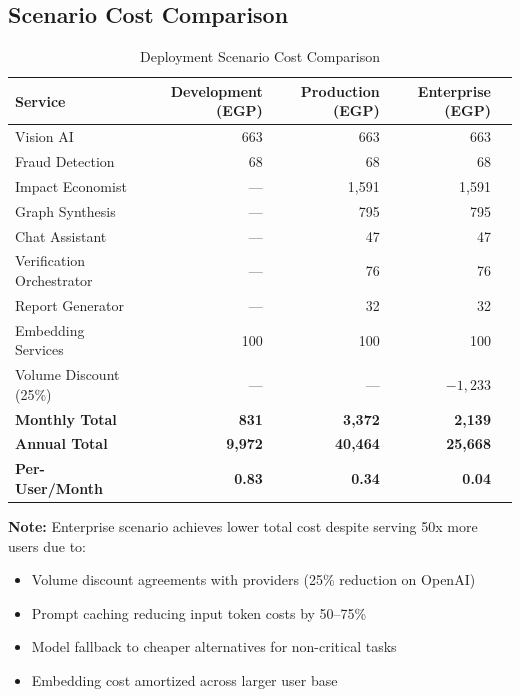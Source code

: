 \documentclass[11pt,a4paper]{article}
\begin{document}
\subsection{Scenario Cost Comparison}

\begin{table}[H]
\centering
\begin{tabular}{|l|r|r|r|r|}
\hline
\textbf{Service} & \textbf{Development (EGP)} & \textbf{Production (EGP)} & \textbf{Enterprise (EGP)} \\
\hline
Vision AI & 663 & 663 & 663 \\
\hline
Fraud Detection & 68 & 68 & 68 \\
\hline
Impact Economist & --- & 1,591 & 1,591 \\
\hline
Graph Synthesis & --- & 795 & 795 \\
\hline
Chat Assistant & --- & 47 & 47 \\
\hline
Verification Orchestrator & --- & 76 & 76 \\
\hline
Report Generator & --- & 32 & 32 \\
\hline
Embedding Services & 100 & 100 & 100 \\
\hline
Volume Discount (25\%) & --- & --- & $-1,233$ \\
\hline
\textbf{Monthly Total} & \textbf{831} & \textbf{3,372} & \textbf{2,139} \\
\hline
\textbf{Annual Total} & \textbf{9,972} & \textbf{40,464} & \textbf{25,668} \\
\hline
\textbf{Per-User/Month} & \textbf{0.83} & \textbf{0.34} & \textbf{0.04} \\
\hline
\end{tabular}
\caption{Deployment Scenario Cost Comparison}
\end{table}

\noindent\textbf{Note:} Enterprise scenario achieves lower total cost despite serving 50x more users due to:
\begin{itemize}[leftmargin=2em]
    \item Volume discount agreements with providers (25\% reduction on OpenAI)
    \item Prompt caching reducing input token costs by 50--75\%
    \item Model fallback to cheaper alternatives for non-critical tasks
    \item Embedding cost amortized across larger user base
\end{itemize}

\newpage
\end{document}
